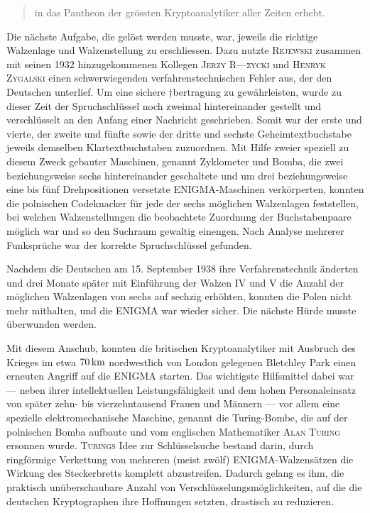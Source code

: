 \documentclass[%
11pt,%
twoside,%
titlepage,%
german,%
headsepline%
]{scrartcl}
\newcounter{theo}[section]\setcounter{theo}{0}
\begin{document}
\begin{quote}
in das Pantheon der grössten Kryptoanalytiker aller Zeiten erhebt.
\end{quote}

Die nächste Aufgabe, die gelöst werden musste, war, jeweils die richtige Walzenlage und Walzenstellung zu erschliessen. Dazu nutzte \textsc{Rejewski} zusammen mit seinen 1932 hinzugekommenen Kollegen \textsc{Jerzy R—\`{z}ycki} und \textsc{Henryk Zygalski} einen schwerwiegenden verfahrenstechnischen Fehler aus, der den Deutschen unterlief. Um eine sichere †bertragung zu gewährleisten, wurde zu dieser Zeit der Spruchschlüssel noch zweimal hintereinander gestellt und ver\-schlüs\-selt an den Anfang einer Nachricht geschrieben. Somit war der erste und vierte, der zweite und fünfte sowie der dritte und sechste Geheimtextbuchstabe jeweils demselben Klartextbuchstaben zuzuordnen. Mit Hilfe zweier speziell zu diesem Zweck gebauter Maschinen, genannt Zyklometer und Bomba, die zwei beziehungsweise sechs hintereinander geschaltete und um drei beziehungsweise eine bis fünf Drehpositionen versetzte ENIGMA-Maschinen verkörperten, konnten die polnischen Codeknacker für jede der sechs möglichen Walzenlagen feststellen, bei welchen Walzenstellungen die beobachtete Zuordnung der Buchstabenpaare möglich war und so den Suchraum gewaltig einengen. Nach Analyse mehrerer Funksprüche war der korrekte Spruchschlüssel gefunden.

Nachdem die Deutschen am 15. September 1938 ihre Verfahrenstechnik änderten und drei Monate später mit Einführung der Walzen IV und V die Anzahl der möglichen Walzenlagen von sechs auf sechzig erhöhten, konnten die Polen nicht mehr mithalten, und die ENIGMA war wieder sicher. Die nächste Hürde musste überwunden werden.

Mit diesem Anschub, konnten die britischen Kryptoanalytiker mit Ausbruch des Krieges im etwa $\unit[70]{km}$ nordwestlich von London gelegenen Bletchley Park einen erneuten Angriff auf die ENIGMA starten. Das wichtigste Hilfsmittel dabei war --- neben ihrer intellektuellen Leistungsfähigkeit und dem hohen Personaleinsatz von später zehn- bis vierzehntausend Frauen und Männern --- vor allem eine spezielle elektromechanische Maschine, genannt die Turing-Bombe, die auf der polnischen Bomba aufbaute und vom englischen Mathematiker \textsc{Alan Turing} ersonnen wurde. \textsc{Turings} Idee zur Schlüsselsuche bestand darin, durch ringförmige Verkettung von mehreren (meist zwölf) ENIGMA-Walzensätzen die Wirkung des Steckerbretts komplett abzustreifen. Dadurch gelang es ihm, die praktisch unüberschaubare Anzahl von Verschlüsselungsmöglichkeiten, auf die die deutschen Kryptographen ihre Hoffnungen setzten, drastisch zu reduzieren.
\end{document}
